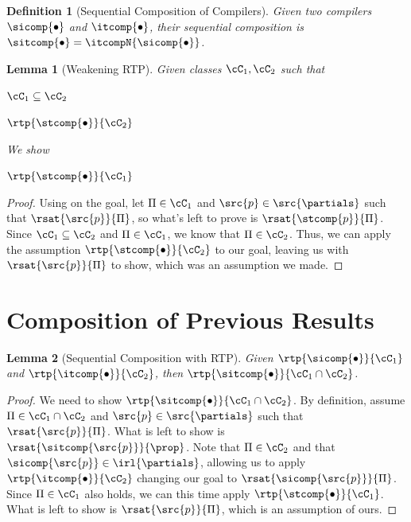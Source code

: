 \documentclass[a4paper,names,dvipsnames]{article}
\newtheorem{definition}{Definition}
\newtheorem{lemma}{Lemma}
\begin{document}
\begin{definition}[Sequential Composition of Compilers]
  Given two compilers $\sicomp{\bullet}$ and $\itcomp{\bullet}$, their sequential composition is $\sitcomp{\bullet}=\itcompN{\sicomp{\bullet}}$.
\end{definition}
%

\begin{lemma}[Weakening RTP]\label{lem:weaken}
  Given classes $\cC_{1}, \cC_{2}$ such that
  \begin{assumptions}
    \item $\cC_{1}\subseteq\cC_{2}$
    \item $\rtp{\stcomp{\bullet}}{\cC_{2}}$
  \end{assumptions}
  We show
  \begin{goals}
    \item $\rtp{\stcomp{\bullet}}{\cC_{1}}$
  \end{goals}
\end{lemma}
\begin{proof}
  Using  on the goal, let $\Pi\in\cC_{1}$ and $\src{p}\in\src{\partials}$ such that $\rsat{\src{p}}{\Pi}$, so what's left to prove is $\rsat{\stcomp{p}}{\Pi}$.
  Since $\cC_{1}\subseteq\cC_{2}$ and $\Pi\in\cC_{1}$, we know that $\Pi\in\cC_{2}$.
  Thus, we can apply the assumption $\rtp{\stcomp{\bullet}}{\cC_{2}}$ to our goal, leaving us with $\rsat{\src{p}}{\Pi}$ to show, which was an assumption we made.
\end{proof}

\section{Composition of Previous Results}

\begin{lemma}[Sequential Composition with RTP]\label{lem:seqcompo}
  Given $\rtp{\sicomp{\bullet}}{\cC_{1}}$ and $\rtp{\itcomp{\bullet}}{\cC_{2}}$, then $\rtp{\sitcomp{\bullet}}{\cC_{1}\cap\cC_{2}}$.
\end{lemma}
\begin{proof}
  We need to show $\rtp{\sitcomp{\bullet}}{\cC_{1}\cap\cC_{2}}$.
  By definition, assume $\Pi\in\cC_{1}\cap\cC_{2}$ and $\src{p}\in\src{\partials}$ such that $\rsat{\src{p}}{\Pi}$.
  What is left to show is $\rsat{\sitcomp{\src{p}}}{\prop}$.
  Note that $\Pi\in\cC_{2}$ and that $\sicomp{\src{p}}\in\irl{\partials}$, allowing us to apply $\rtp{\itcomp{\bullet}}{\cC_{2}}$ changing our goal to $\rsat{\sicomp{\src{p}}}{\Pi}$.
  Since $\Pi\in\cC_{1}$ also holds, we can this time apply $\rtp{\stcomp{\bullet}}{\cC_{1}}$.
  What is left to show is $\rsat{\src{p}}{\Pi}$, which is an assumption of ours.
\end{proof}
\end{document}
